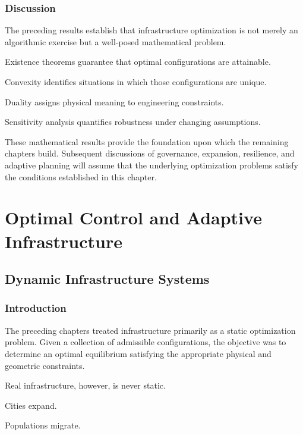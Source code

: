 \documentclass[11pt,fleqn]{book}
\numberwithin{equation}{chapter}
\theoremstyle{plain}
\theoremstyle{definition}
\theoremstyle{remark}
\begin{document}

\section{Discussion}

The preceding results establish that infrastructure optimization is not
merely an algorithmic exercise but a well-posed mathematical problem.

Existence theorems guarantee that optimal configurations are attainable.

Convexity identifies situations in which those configurations are
unique.

Duality assigns physical meaning to engineering constraints.

Sensitivity analysis quantifies robustness under changing assumptions.

These mathematical results provide the foundation upon which the
remaining chapters build. Subsequent discussions of governance,
expansion, resilience, and adaptive planning will assume that the
underlying optimization problems satisfy the conditions established in
this chapter.

\part{Optimal Control and Adaptive Infrastructure}

\chapter{Dynamic Infrastructure Systems}

\section{Introduction}

The preceding chapters treated infrastructure primarily as a static
optimization problem. Given a collection of admissible configurations,
the objective was to determine an optimal equilibrium satisfying the
appropriate physical and geometric constraints.

Real infrastructure, however, is never static.

Cities expand.

Populations migrate.
\end{document}
